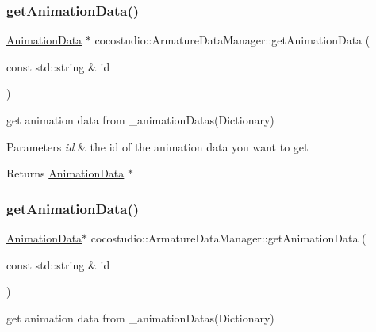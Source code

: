 \subsubsection{\texorpdfstring{get\+Animation\+Data()}{getAnimationData()}\hspace{0.1cm}{\footnotesize\ttfamily [1/2]}}
{\footnotesize\ttfamily \hyperlink{classcocostudio_1_1AnimationData}{Animation\+Data} $\ast$ cocostudio\+::\+Armature\+Data\+Manager\+::get\+Animation\+Data (\begin{DoxyParamCaption}\item[{const std\+::string \&}]{id }\end{DoxyParamCaption})}



get animation data from \+\_\+animation\+Datas(\+Dictionary) 


\begin{DoxyParams}{Parameters}
{\em id} & the id of the animation data you want to get \\
\hline
\end{DoxyParams}
\begin{DoxyReturn}{Returns}
\hyperlink{classcocostudio_1_1AnimationData}{Animation\+Data} $\ast$ 
\end{DoxyReturn}
\mbox{\label{classcocostudio_1_1ArmatureDataManager_aa16bcd30c063c4143787fe799a6f4a45}} 
\subsubsection{\texorpdfstring{get\+Animation\+Data()}{getAnimationData()}\hspace{0.1cm}{\footnotesize\ttfamily [2/2]}}
{\footnotesize\ttfamily \hyperlink{classcocostudio_1_1AnimationData}{Animation\+Data}$\ast$ cocostudio\+::\+Armature\+Data\+Manager\+::get\+Animation\+Data (\begin{DoxyParamCaption}\item[{const std\+::string \&}]{id }\end{DoxyParamCaption})}



get animation data from \+\_\+animation\+Datas(\+Dictionary) 


